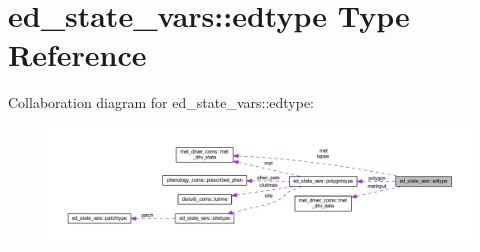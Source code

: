 \hypertarget{structed__state__vars_1_1edtype}{}\section{ed\+\_\+state\+\_\+vars\+:\+:edtype Type Reference}
\label{structed__state__vars_1_1edtype}


Collaboration diagram for ed\+\_\+state\+\_\+vars\+:\+:edtype\+:\nopagebreak
\begin{figure}[H]
\begin{center}
\leavevmode
\includegraphics[width=350pt]{structed__state__vars_1_1edtype__coll__graph}
\end{center}
\end{figure}
